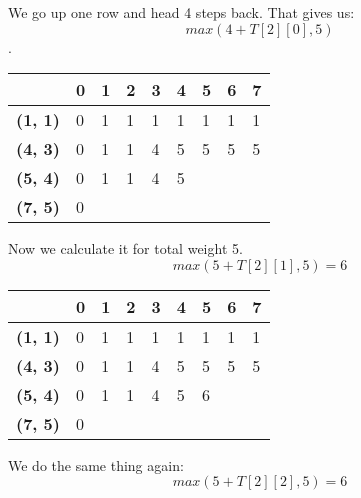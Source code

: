 \documentclass{article}
\begin{document}
We go up one row and head 4 steps back. That gives us:
$$max(4 + T[2][0], 5)$$.
\begin{center}
\begin{tabular}{|l|l|l|l|l|l|l|l|l|}
\hline
                & \textbf{0} & \textbf{1} & \textbf{2} & \textbf{3} & \textbf{4} & \textbf{5} & \textbf{6} & \textbf{7} \\ \hline
\textbf{(1, 1)} & 0          &1            &1            &1            &1            &1            &1            &1            \\ \hline
\textbf{(4, 3)} & 0          &1            &1            &4            &5            &5            &  5          &  5          \\ \hline
\textbf{(5, 4)} & 0          &1            &1            &4            &5            &            &            &            \\ \hline
\textbf{(7, 5)} & 0          &            &            &            &            &            &            &            \\ \hline
\end{tabular}
\end{center}
Now we calculate it for total weight 5. 
$$max(5 + T[2][1], 5) = 6$$
\begin{center}
\begin{tabular}{|l|l|l|l|l|l|l|l|l|}
\hline
                & \textbf{0} & \textbf{1} & \textbf{2} & \textbf{3} & \textbf{4} & \textbf{5} & \textbf{6} & \textbf{7} \\ \hline
\textbf{(1, 1)} & 0          &1            &1            &1            &1            &1            &1            &1            \\ \hline
\textbf{(4, 3)} & 0          &1            &1            &4            &5            &5            &  5          &  5          \\ \hline
\textbf{(5, 4)} & 0          &1            &1            &4            &5            &6            &            &            \\ \hline
\textbf{(7, 5)} & 0          &            &            &            &            &            &            &            \\ \hline
\end{tabular}
\end{center}
We do the same thing again:
$$max(5 + T[2][2], 5) = 6$$
\end{document}

